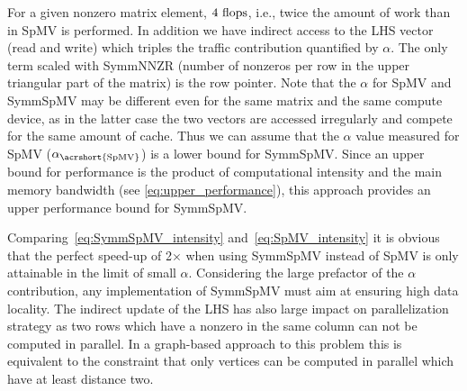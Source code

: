 For a given nonzero matrix element, $4~\mbox{flops}$, i.e., twice the amount of work than in \acrshort{SpMV} is performed. In addition we have indirect access to the LHS vector (read and write) which triples the traffic contribution quantified by $\alpha$\@. The only term scaled with \acrshort{SymmNNZR} (number of nonzeros per row in the upper triangular part of the matrix) is the row pointer.   Note that the $\alpha$ for \acrshort{SpMV} and \acrshort{SymmSpMV} may be different even for the same matrix and the same compute device, as in the latter case the two vectors are accessed irregularly and compete for the same amount of cache. Thus we can assume that the $\alpha$ value measured for \acrshort{SpMV} ($\alpha_\mathrm{\acrshort{SpMV}}$) is a lower bound for \acrshort{SymmSpMV}. Since an upper bound for performance is the product of computational intensity and the main memory bandwidth (see \cref{eq:upper_performance}), this approach provides an upper performance bound for \acrshort{SymmSpMV}.  

Comparing~\cref{eq:SymmSpMV_intensity} and~\cref{eq:SpMV_intensity} it is obvious that the perfect speed-up of 2$\times$ when using \acrshort{SymmSpMV} instead of \acrshort{SpMV} is only attainable in the limit of small $\alpha$\@. %
Considering the large prefactor of the $\alpha$ contribution, any implementation of \acrshort{SymmSpMV} must aim at ensuring high data locality. The indirect update of the LHS has also large impact on parallelization strategy as two rows which have a nonzero in the same column can not be computed in parallel. In a graph-based approach to this problem this is equivalent to the constraint that only vertices can be computed in parallel which have at least distance two.

